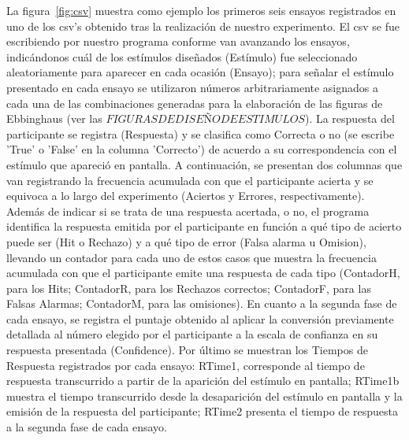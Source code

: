 La figura~\ref{fig:csv} muestra como ejemplo los primeros seis ensayos registrados en uno de los csv's obtenido tras la realización de nuestro experimento. El csv se fue escribiendo por nuestro programa conforme van avanzando los ensayos, indicándonos cuál de los estímulos diseñados (Estímulo) fue seleccionado aleatoriamente para aparecer en cada ocasión (Ensayo); para señalar el estímulo presentado en cada ensayo se utilizaron números arbitrariamente asignados a cada una de las combinaciones generadas para la elaboración de las figuras de Ebbinghaus (ver las $FIGURAS DE DISEÑO DE ESTIMULOS$). La respuesta del participante se registra (Respuesta) y se clasifica como Correcta o no (se escribe 'True' o 'False' en la columna 'Correcto') de acuerdo a su correspondencia con el estímulo que apareció en pantalla. A continuación, se presentan dos columnas que van registrando la frecuencia acumulada con que el participante acierta y se equivoca a lo largo del experimento (Aciertos y Errores, respectivamente). Además de indicar si se trata de una respuesta acertada, o no, el programa identifica la respuesta emitida por el participante en función a qué tipo de acierto puede ser (Hit o Rechazo) y a qué tipo de error (Falsa alarma u Omision), llevando un contador para cada uno de estos casos que muestra la frecuencia acumulada con que el participante emite una respuesta de cada tipo (ContadorH, para los Hits; ContadorR, para los Rechazos correctos; ContadorF, para las Falsas Alarmas; ContadorM, para las omisiones). En cuanto a la segunda fase de cada ensayo, se registra el puntaje obtenido al aplicar la conversión previamente detallada al número elegido por el participante a la escala de confianza en su respuesta presentada (Confidence). Por último se muestran los Tiempos de Respuesta registrados por cada ensayo: RTime1, corresponde al tiempo de respuesta transcurrido a partir de la aparición del estímulo en pantalla; RTime1b muestra el tiempo transcurrido desde la desaparición del estímulo en pantalla y la emisión de la respuesta del participante; RTime2 presenta el tiempo de respuesta a la segunda fase de cada ensayo.\\ 

